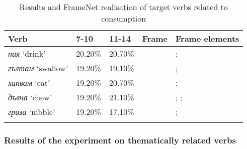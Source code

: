 \documentclass[output=paper,colorlinks,citecolor=brown]{langscibook}
\begin{document}
\begin{table}
\begin{tabularx}{\textwidth}{QllXQ}
\lsptoprule
Verb & 7-10 & 11-14 & Frame & Frame elements \\
\midrule
\textit{пия} \newline `drink' & 20.20\% & 20.70\% &  & ;  \\\midrule
\textit{гълтам} \newline `swallow' & 19.20\% & 19.10\% &  & ;  \\\midrule
\textit{хапвам} \newline `eat' & 19.20\% & 20.70\% &  & ;  \\\midrule
\textit{дъвча} \newline `chew' & 19.20\% & 21.10\% &  & ; ;  \\\midrule
\textit{гриза} \newline `nibble' & 19.20\% & 17.10\% &  & ;  \\
\lspbottomrule
\end{tabularx}
\caption{Results and FrameNet realisation of target verbs related to consumption}
\label{tab:chapterhandle:keytotable4}
\end{table}

\subsubsection{Results of the experiment on thematically related verbs}\label{subsubsect:4.1.4}
\end{document}
